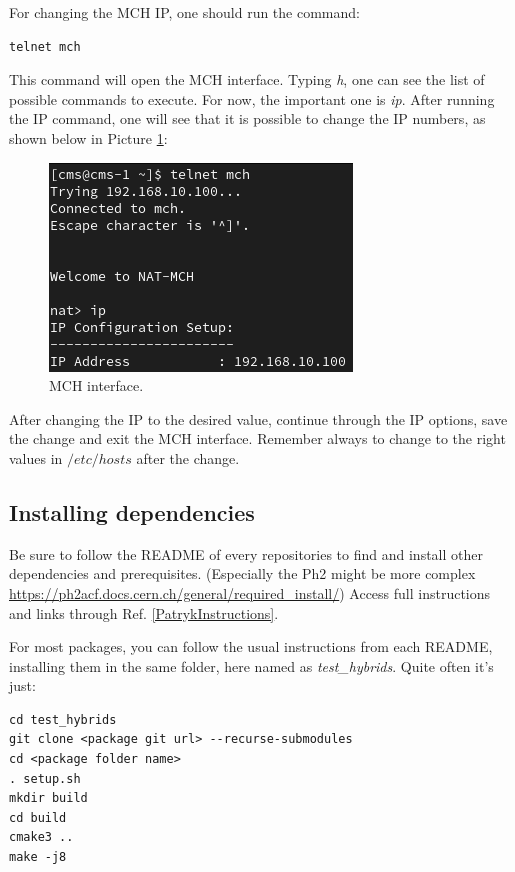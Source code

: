 \documentclass[10pt,a4paper]{article}
\begin{document}
For changing the MCH IP, one should run the command:

\begin{framed}
\begin{verbatim}
telnet mch
\end{verbatim}
\end{framed}

This command will open the MCH interface. Typing \textit{h}, one can see the list of possible commands to execute. For now, the important one is \textit{ip}. After running the IP command, one will see that it is possible to change the IP numbers, as shown below in Picture \ref{telnet}:

\begin{figure}[h!]
\centering
 \includegraphics[width=.5\linewidth]{Pictures/telnet.png} 
  \caption{MCH interface.}
  \label{telnet}
\end{figure}

After changing the IP to the desired value, continue through the IP options, save the change and exit the MCH interface. Remember always to change to the right values in $/etc/hosts $ after the change.


\subsection{Installing dependencies}

Be sure to follow the README of every repositories to find and install other dependencies and prerequisites.
(Especially the Ph2 might be more complex \url{https://ph2acf.docs.cern.ch/general/required_install/})
Access full instructions and links through Ref. \ref{PatrykInstructions}. 

For most packages, you can follow the usual instructions from each README, installing them in the same folder, here named as \emph{test\_hybrids}.
Quite often it’s just:

\begin{framed}
\begin{verbatim}
cd test_hybrids
git clone <package git url> --recurse-submodules
cd <package folder name>
. setup.sh
mkdir build
cd build
cmake3 ..
make -j8
\end{verbatim}
\end{framed}
\end{document}
